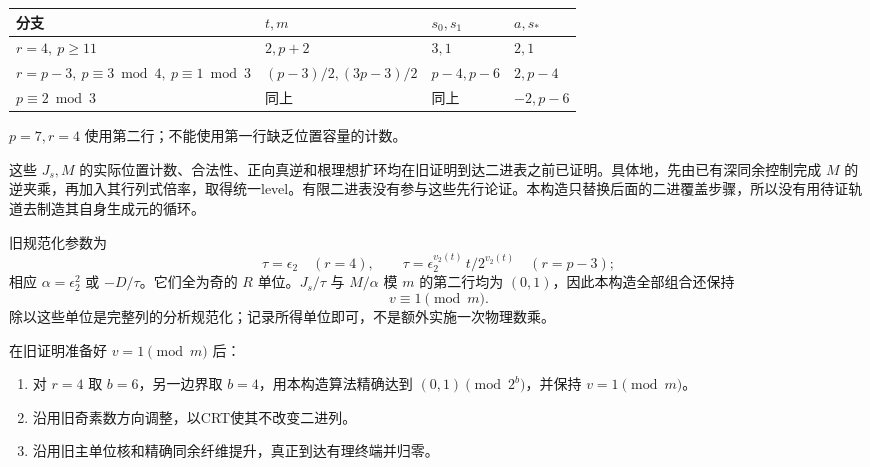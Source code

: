 { %
\begin{longtable}[]{@{}
  >{\raggedright\arraybackslash}p{}
  >{\raggedright\arraybackslash}p{}
  >{\raggedright\arraybackslash}p{}
  >{\raggedright\arraybackslash}p{}@{}}
\toprule\noalign{}
\begin{minipage}[b]{\linewidth}\raggedright
{分支}
\end{minipage} & \begin{minipage}[b]{\linewidth}\raggedright
\(t,m\)
\end{minipage} & \begin{minipage}[b]{\linewidth}\raggedright
\(s_0,s_1\)
\end{minipage} & \begin{minipage}[b]{\linewidth}\raggedright
\(a,s_*\)
\end{minipage} \\
\midrule\noalign{}
\endhead
\bottomrule\noalign{}
\endlastfoot
\(r=4,\ p\ge11\) & \(2,p+2\) & \(3,1\) & \(2,1\) \\
\(r=p-3,\ p\equiv3\bmod4,\ p\equiv1\bmod3\) & \((p-3)/2,(3p-3)/2\) & \(p-4,p-6\) & \(2,p-4\) \\
{同上且} \(p\equiv2\bmod3\) & {同上} & {同上} & \(-2,p-6\) \\
\end{longtable}
}

\(p=7,r=4\) {使用第二行；不能使用第一行缺乏位置容量的计数。}

{这些} \(J_s,M\) {的实际位置计数、合法性、正向真逆和根理想扩环均在旧证明到达二进表之前已证明。具体地，先由已有深同余控制完成} \(M\) {的逆夹乘，再加入其行列式倍率，取得统一level。有限二进表没有参与这些先行论证。本构造只替换后面的二进覆盖步骤，所以没有用待证轨道去制造其自身生成元的循环。}

{旧规范化参数为} \[
\tau=\epsilon_2\quad(r=4),\qquad
\tau=\epsilon_2^{v_2(t)}\,t/2^{v_2(t)}
       \quad(r=p-3);
\] {相应} \(\alpha=\epsilon_2^2\) {或} \(-D/\tau\){。它们全为奇的} \(R\) {单位。}\(J_s/\tau\) {与} \(M/\alpha\) {模} \(m\) {的第二行均为} \((0,1)\){，因此本构造全部组合还保持} \[
v\equiv1\pmod m.
\] {除以这些单位是完整列的分析规范化；记录所得单位即可，不是额外实施一次物理数乘。}

{在旧证明准备好} \(v=1\pmod m\) {后：}

\begin{enumerate}
\def\labelenumi{\arabic{enumi}.}
\tightlist
\item
  {对} \(r=4\) {取} \(b=6\){，另一边界取} \(b=4\){，用本构造算法精确达到} \((0,1)\pmod{2^b}\){，并保持} \(v=1\pmod m\){。}
\item
  {沿用旧奇素数方向调整，以CRT使其不改变二进列。}
\item
  {沿用旧主单位核和精确同余纤维提升，真正到达有理终端并归零。}
\end{enumerate}


